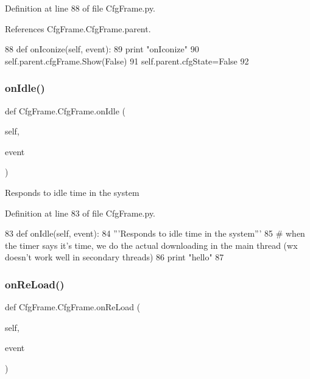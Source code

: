 Definition at line 88 of file Cfg\+Frame.\+py.



References Cfg\+Frame.\+Cfg\+Frame.\+parent.


\begin{DoxyCode}
88     \textcolor{keyword}{def }onIconize(self, event):
89         \textcolor{keywordflow}{print} \textcolor{stringliteral}{"onIconize"}
90         self.parent.cfgFrame.Show(\textcolor{keyword}{False})
91         self.parent.cfgState=\textcolor{keyword}{False}
92 
\end{DoxyCode}
\mbox{\label{classCfgFrame_1_1CfgFrame_ad63704259ed900af6c1d0844c07aaea9}} 
\subsubsection{\texorpdfstring{on\+Idle()}{onIdle()}}
{\footnotesize\ttfamily def Cfg\+Frame.\+Cfg\+Frame.\+on\+Idle (\begin{DoxyParamCaption}\item[{}]{self,  }\item[{}]{event }\end{DoxyParamCaption})}

\begin{DoxyVerb}Responds to idle time in the system\end{DoxyVerb}
 

Definition at line 83 of file Cfg\+Frame.\+py.


\begin{DoxyCode}
83     \textcolor{keyword}{def }onIdle(self, event):
84         \textcolor{stringliteral}{'''Responds to idle time in the system'''}
85         \textcolor{comment}{# when the timer says it's time, we do the actual downloading in the main thread (wx doesn't work
       well in secondary threads)}
86         \textcolor{keywordflow}{print} \textcolor{stringliteral}{"hello"}        
87 
\end{DoxyCode}
\mbox{\label{classCfgFrame_1_1CfgFrame_a3aaf73db16dddc96228e7d0fe3900d3a}} 
\subsubsection{\texorpdfstring{on\+Re\+Load()}{onReLoad()}}
{\footnotesize\ttfamily def Cfg\+Frame.\+Cfg\+Frame.\+on\+Re\+Load (\begin{DoxyParamCaption}\item[{}]{self,  }\item[{}]{event }\end{DoxyParamCaption})}



